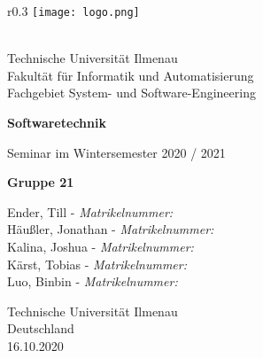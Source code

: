 \begin{fullpage}
	\begin{titlepage}
		
		\begin{wrapfigure}[0]{r}{0.3\textwidth}
			\texttt{[image: logo.png]}
		\end{wrapfigure} 
		\,\\
		Technische Universität Ilmenau\\
		Fakultät für Informatik und Automatisierung\\
		Fachgebiet System- und Software-Engineering\\
	
		\begin{center}
			\vspace{5cm}
			
			\begin{Large}
				\textbf{Softwaretechnik}
			\end{Large}
			
			\vspace{0.5cm}
			Seminar im Wintersemester 2020 / 2021
			
			\vspace{1.5cm}
			\begin{Large}
				\textbf{Gruppe 21}
			\end{Large}
			
			\vspace{0.5cm}
			
			Ender, Till - \textit{Matrikelnummer: }\\
			Häußler, Jonathan - \textit{Matrikelnummer: }\\
			Kalina, Joshua - \textit{Matrikelnummer: }\\
			Kärst, Tobias - \textit{Matrikelnummer: }\\	
			Luo, Binbin - \textit{Matrikelnummer: }\\
			
			\vspace{1.5cm}
							
			Technische Universität Ilmenau\\
			Deutschland\\
			16.10.2020
			
			\vspace{5cm}
		\end{center}
	\end{titlepage}	
\end{fullpage}